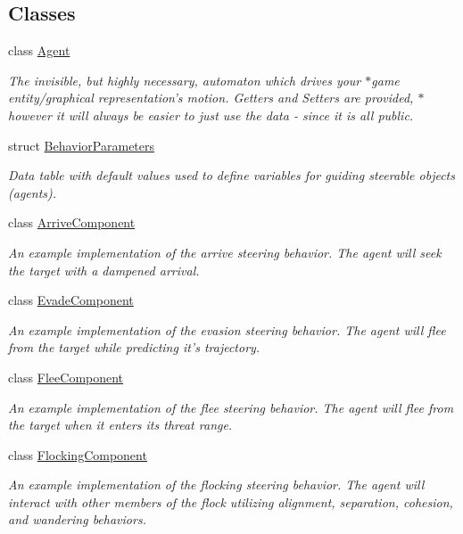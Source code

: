 \subsection*{Classes}
\begin{DoxyCompactItemize}
\item 
class \hyperlink{classsteer_1_1_agent}{Agent}
\begin{DoxyCompactList}\small\item\em The invisible, but highly necessary, automaton which drives your $\ast$game entity/graphical representation's motion. Getters and Setters are provided, $\ast$however it will always be easier to just use the data -\/ since it is all public. \end{DoxyCompactList}\item 
struct \hyperlink{structsteer_1_1_behavior_parameters}{Behavior\-Parameters}
\begin{DoxyCompactList}\small\item\em Data table with default values used to define variables for guiding steerable objects (agents). \end{DoxyCompactList}\item 
class \hyperlink{classsteer_1_1_arrive_component}{Arrive\-Component}
\begin{DoxyCompactList}\small\item\em An example implementation of the arrive steering behavior. The agent will seek the target with a dampened arrival. \end{DoxyCompactList}\item 
class \hyperlink{classsteer_1_1_evade_component}{Evade\-Component}
\begin{DoxyCompactList}\small\item\em An example implementation of the evasion steering behavior. The agent will flee from the target while predicting it's trajectory. \end{DoxyCompactList}\item 
class \hyperlink{classsteer_1_1_flee_component}{Flee\-Component}
\begin{DoxyCompactList}\small\item\em An example implementation of the flee steering behavior. The agent will flee from the target when it enters its threat range. \end{DoxyCompactList}\item 
class \hyperlink{classsteer_1_1_flocking_component}{Flocking\-Component}
\begin{DoxyCompactList}\small\item\em An example implementation of the flocking steering behavior. The agent will interact with other members of the flock utilizing alignment, separation, cohesion, and wandering behaviors. \end{DoxyCompactList}\item 

\end{DoxyCompactItemize}
